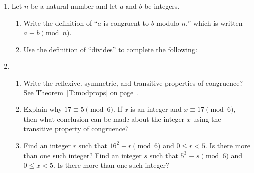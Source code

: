 \begin{previewactivity}\label{PA:congruencereview} \hfill 
\begin{enumerate}
\item Let $n$ be a natural number and let $a$ and $b$ be integers.
\begin{enumerate}
\item Write the definition of ``$a$ is congruent to $b$ modulo $n$,'' which is written 
$a \equiv b \pmod n$.

\item Use the definition of ``divides'' to complete the following:

\end{enumerate}

\item 
\begin{enumerate}
\item Write the reflexive, symmetric, and transitive properties of congruence?  See 
Theorem~\ref{T:modprops} on page~\pageref{T:modprops}.

\item Explain why $17 \equiv 5 \pmod 6$.  If $x$ is an integer and  $x \equiv 17 \pmod 6$, then what conclusion can be made about the integer $x$ using the transitive property of congruence?

\item Find an integer $r$ such that $16^2 \equiv r \pmod 6$ and $0 \leq r < 5$.  Is there more than one such integer?  Find an integer $s$ such that \linebreak
$5^3 \equiv s \pmod 6$ and 
$0 \leq x < 5$.  Is there more than one such integer?
\end{enumerate}
\end{enumerate}
\end{previewactivity}
\hbreak

\endinput
